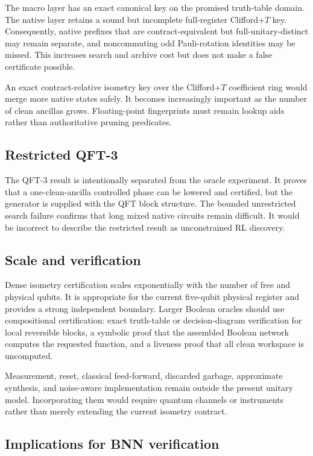The macro layer has an exact canonical key on the promised truth-table domain.  The native layer retains a sound but incomplete full-register Clifford+$T$ key.  Consequently, native prefixes that are contract-equivalent but full-unitary-distinct may remain separate, and noncommuting odd Pauli-rotation identities may be missed.  This increases search and archive cost but does not make a false certificate possible.

An exact contract-relative isometry key over the Clifford+$T$ coefficient ring would merge more native states safely.  It becomes increasingly important as the number of clean ancillas grows.  Floating-point fingerprints must remain lookup aids rather than authoritative pruning predicates.

\subsection{Restricted QFT-3}

The QFT-3 result is intentionally separated from the oracle experiment.  It proves that a one-clean-ancilla controlled phase can be lowered and certified, but the generator is supplied with the QFT block structure.  The bounded unrestricted search failure confirms that long mixed native circuits remain difficult.  It would be incorrect to describe the restricted result as unconstrained RL discovery.

\subsection{Scale and verification}

Dense isometry certification scales exponentially with the number of free and physical qubits.  It is appropriate for the current five-qubit physical register and provides a strong independent boundary.  Larger Boolean oracles should use compositional certification: exact truth-table or decision-diagram verification for local reversible blocks, a symbolic proof that the assembled Boolean network computes the requested function, and a liveness proof that all clean workspace is uncomputed.

Measurement, reset, classical feed-forward, discarded garbage, approximate synthesis, and noise-aware implementation remain outside the present unitary model.  Incorporating them would require quantum channels or instruments rather than merely extending the current isometry contract.

\subsection{Implications for BNN verification}

